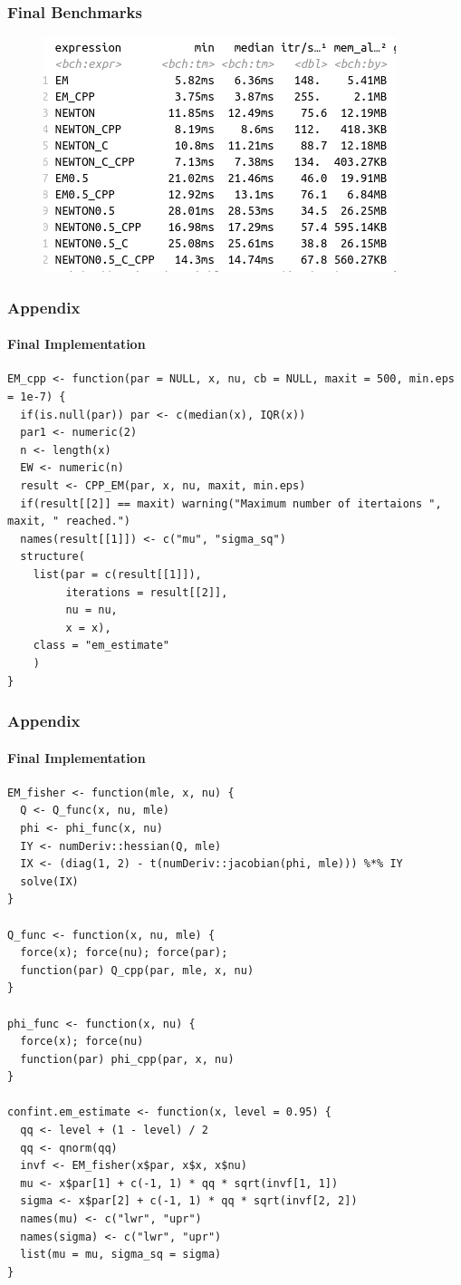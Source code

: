 \documentclass[aspectratio=169]{beamer}
\begin{document}
\begin{frame}
    \frametitle{Final Benchmarks}
    \begin{figure}
        \centering
        \includegraphics[scale = 0.6]{figure/C_NewtonVsEm.png}
    \end{figure}
\end{frame}
\begin{frame}[fragile]
    \frametitle{Appendix}
    \framesubtitle{Final Implementation}   
\begin{verbatim}
EM_cpp <- function(par = NULL, x, nu, cb = NULL, maxit = 500, min.eps = 1e-7) {
  if(is.null(par)) par <- c(median(x), IQR(x))
  par1 <- numeric(2)
  n <- length(x)
  EW <- numeric(n)
  result <- CPP_EM(par, x, nu, maxit, min.eps)
  if(result[[2]] == maxit) warning("Maximum number of itertaions ", maxit, " reached.")
  names(result[[1]]) <- c("mu", "sigma_sq")
  structure(
    list(par = c(result[[1]]), 
         iterations = result[[2]], 
         nu = nu, 
         x = x),
    class = "em_estimate"
    )
}
\end{verbatim}
\end{frame}
\begin{frame}[fragile]
    \frametitle{Appendix}
    \framesubtitle{Final Implementation}
\begin{verbatim}
EM_fisher <- function(mle, x, nu) {
  Q <- Q_func(x, nu, mle)
  phi <- phi_func(x, nu)
  IY <- numDeriv::hessian(Q, mle)
  IX <- (diag(1, 2) - t(numDeriv::jacobian(phi, mle))) %*% IY
  solve(IX)
}

Q_func <- function(x, nu, mle) {
  force(x); force(nu); force(par);
  function(par) Q_cpp(par, mle, x, nu)
}

phi_func <- function(x, nu) {
  force(x); force(nu)
  function(par) phi_cpp(par, x, nu)
}

confint.em_estimate <- function(x, level = 0.95) {
  qq <- level + (1 - level) / 2
  qq <- qnorm(qq)
  invf <- EM_fisher(x$par, x$x, x$nu)
  mu <- x$par[1] + c(-1, 1) * qq * sqrt(invf[1, 1])
  sigma <- x$par[2] + c(-1, 1) * qq * sqrt(invf[2, 2])
  names(mu) <- c("lwr", "upr")
  names(sigma) <- c("lwr", "upr")
  list(mu = mu, sigma_sq = sigma)
}
\end{verbatim}
\end{frame}
\end{document}
